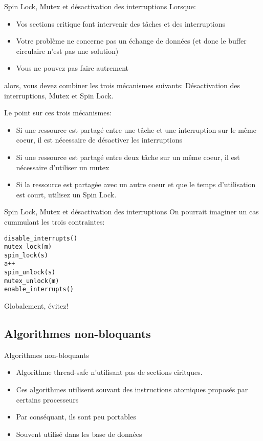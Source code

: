 \begin{frame}[fragile]{Spin Lock, Mutex et désactivation des interruptions}
  Lorsque:
  \begin{itemize} 
  \item  Vos  sections critique  font  intervenir  des  tâches et  des
    interruptions
  \item Votre problème ne concerne  pas un échange de données (et donc
    le buffer circulaire n'est pas une solution)
  \item Vous ne pouvez pas faire autrement
  \end{itemize} 
  alors,   vous  devez   combiner  les   trois   mécanismes  suivants:
  Désactivation des interruptions, Mutex et Spin Lock.

  Le point sur ces trois mécanismes:
  \begin{itemize} 
  \item  Si  une  ressource  est   partagé  entre  une  tâche  et  une
    interruption sur  le même coeur,  il est nécessaire  de désactiver
    les interruptions
  \item  Si une ressource  est partagé  entre deux  tâche sur  un même
    coeur, il est nécessaire d'utiliser un mutex
  \item Si  la ressource est  partagée avec un  autre coeur et  que le
    temps d'utilisation est court, utilisez un Spin Lock.
  \end{itemize}
\end{frame}

\begin{frame}[fragile]{Spin Lock, Mutex et désactivation des interruptions}
  On pourrait imaginer un cas cummulant les trois contraintes:
  \begin{lstlisting} 
disable_interrupts()
mutex_lock(m)
spin_lock(s)
a++
spin_unlock(s)
mutex_unlock(m)
enable_interrupts()
  \end{lstlisting} 
  Globalement, évitez!
\end{frame} 

\subsection{Algorithmes non-bloquants}

\begin{frame}{Algorithmes non-bloquants}
  \begin{itemize} 
  \item Algorithme thread-safe n'utilisant pas de sections ciritques. 
  \item Ces  algorithmes utilisent souvant  des instructions atomiques
    proposés par certains processeurs
  \item Par conséquant, ils sont peu portables
  \item Souvent utilisé dans les base de données
  \end{itemize} 
\end{frame} 

